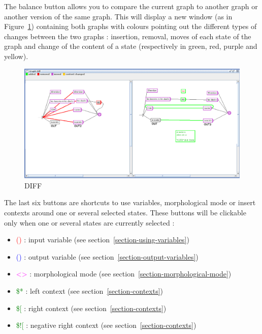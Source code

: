 \bigskip
\noindent The balance button allows you to compare the current graph to another graph or another version of the same graph. This will display a new window (as in Figure~\ref{Graph-DIFF}) containing both graphs with colours pointing out the different types of changes between the two graphs : insertion, removal, moves of each state of the graph and change of the content of a state (respectively in green, red, purple and yellow).

\bigskip
\noindent 
\begin{figure}[!h]
\begin{center}
\includegraphics[width=15.6cm]{resources/img/DIFF.png}
\caption{DIFF\label{Graph-DIFF}}
\end{center}
\end{figure}
\bigskip
\noindent 

The last six buttons are shortcuts to use variables, morphological mode or insert contexts around one or several selected states. These buttons will be clickable only when one or several states are currently selected :
\begin{itemize}
\item \textcolor{red}{()}  : input variable	(see section~\ref{section-using-variables})
\item \textcolor{blue}{()} : output variable (see section~\ref{section-output-variables})
\item \textcolor{magenta}{<>}  : morphological mode (see section~\ref{section-morphological-mode})
\item \textcolor{green}{\$*} : left context (see section~\ref{section-contexts})
\item \textcolor{green}{\$[} : right context (see section~\ref{section-contexts})
\item \textcolor{green}{\$![} : negative right context (see section~\ref{section-contexts})
\end{itemize}

